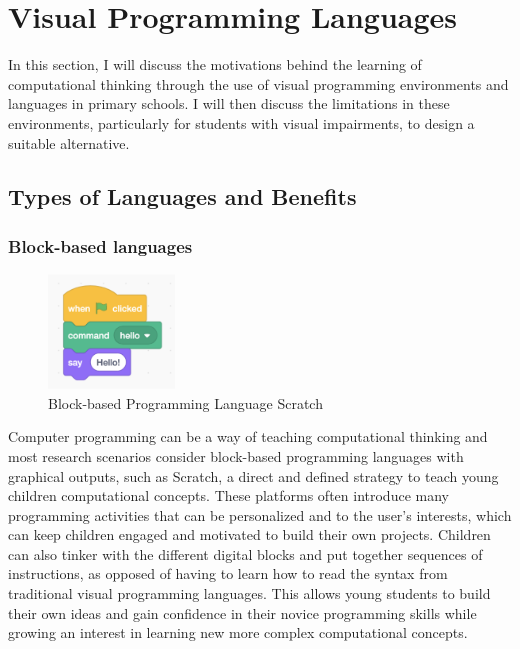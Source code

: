 \documentclass[oneside,%
                    author={Malak Hajji},
                    degree={BSc},
                    title={Designing An Accessible Computational Toolkit For Students},
                  subtitle={With Mixed Visual Abilities}]{dissertation}
\begin{document}
\section{Visual Programming Languages}

In this section, I will discuss the motivations behind the learning of computational thinking through the use of visual programming environments and languages in primary schools.
I will then discuss the limitations in these environments, particularly for students with visual impairments, to design a suitable alternative.

\subsection{Types of Languages and Benefits}
\subsubsection{Block-based languages}
\begin{figure}
    \centering
    \includegraphics[width=0.3\textwidth]{thesis/scratch.eps}
    \caption{Block-based Programming Language Scratch ~\cite{scratch}}
    \label{fig-scratch}
\end{figure}
Computer programming can be a way of teaching computational thinking and most research scenarios consider block-based programming languages with graphical outputs, such as Scratch\cite{scratch}, a direct and defined strategy to teach young children computational concepts\cite{blocks}. These platforms often introduce many programming activities that can be personalized and to the user's interests, which can keep children engaged and motivated to build their own projects. Children can also tinker with the different digital blocks and put together sequences of instructions, as opposed of having to learn how to read the syntax from traditional visual programming languages. This allows young students to build their own ideas and gain confidence in their novice programming skills while growing an interest in learning new more complex computational concepts.\cite{confidence}
\end{document}
